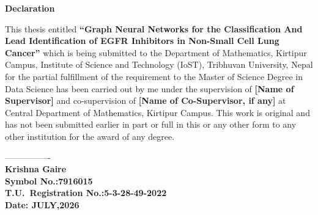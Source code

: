 
\cleardoublepage
{}
{}
\thispagestyle{plain}

\begin{center}
{\fontsize{16}{20}\selectfont\textbf{Declaration}}
\end{center}

\vspace{0.5cm}

\begin{onehalfspace}
\noindent
This thesis entitled \textbf{``Graph Neural Networks for the
Classification And Lead Identification of EGFR Inhibitors in
Non-Small Cell Lung Cancer''} which is being submitted to the
Department of Mathematics, Kirtipur Campus, Institute of Science
and Technology (IoST), Tribhuvan University, Nepal for the partial
fulfillment of the requirement to the Master of Science Degree in
Data Science has been carried out by me under the supervision of
\textbf{[Name of Supervisor]} and co-supervision of
\textbf{[Name of Co-Supervisor, if any]} at Central Department of
Mathematics, Kirtipur Campus. This work is original and has not
been submitted earlier in part or full in this or any other form
to any other institution for the award of any degree.
\end{onehalfspace}

\vspace{3cm}

\begin{onehalfspace}
\noindent
----------------\\[0.3cm]
\textbf{Krishna Gaire}\\
\textbf{Symbol No.:7916015}\\
\textbf{T.U.\ Registration No.:5-3-28-49-2022}\\[0.3cm]
\textbf{Date: JULY,2026}
\end{onehalfspace}